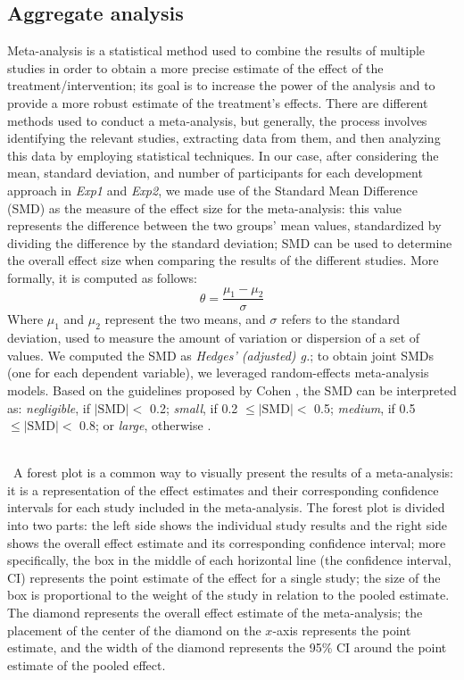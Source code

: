 \subsection{Aggregate analysis}
Meta-analysis is a statistical method used to combine the results of multiple studies in order to obtain a more precise estimate of the effect of the treatment/intervention; its goal is to increase the power of the analysis and to provide a more robust estimate of the treatment's effects.
There are different methods used to conduct a meta-analysis, but generally, the process involves identifying the relevant studies, extracting data from them, and then analyzing this data by employing statistical techniques. 
In our case, after considering the mean, standard deviation, and number of participants for each development approach in \textit{Exp1} and \textit{Exp2}, we made use of the Standard Mean Difference (SMD) as the measure of the effect size for the meta-analysis: this value represents the difference between the two groups' mean values, standardized by dividing the difference by the standard deviation; SMD can be used to determine the overall effect size when comparing the results of the different studies. More formally, it is computed as follows:
\[
    \theta = \frac{\mu_1 - \mu_2}{\sigma}
\]
Where $\mu_1$ and $\mu_2$ represent the two means, and $\sigma$ refers to the standard deviation, used to measure the amount of variation or dispersion of a set of values.
We computed the SMD as \textit{Hedges' (adjusted) g.}; to obtain joint SMDs (one for each dependent variable), we leveraged random-effects meta-analysis models.
\noindent Based on the guidelines proposed by Cohen \cite{Cohen:1992}, the SMD can be interpreted as: \textit{negligible}, if $|\text{SMD}| <$ 0.2; \textit{small}, if 0.2 $\le |\text{SMD}| <$ 0.5; \textit{medium}, if 0.5 $\le |\text{SMD}| <$ 0.8; or \textit{large}, otherwise \cite{DBLP:conf/esem/RomanoZBPS22}.

\ \\ \
A forest plot is a common way to visually present the results of a meta-analysis: it is a representation of the effect estimates and their corresponding confidence intervals for each study included in the meta-analysis. The forest plot is divided into two parts: the left side shows the individual study results and the right side shows the overall effect estimate and its corresponding confidence interval; more specifically, the box in the middle of each horizontal line (\ie the confidence interval, CI) represents the point estimate of the effect for a single study; the size of the box is proportional to the weight of the study in relation to the pooled estimate. The diamond represents the overall effect estimate of the meta-analysis; the placement of the center of the diamond on the $x$-axis represents the point estimate, and the width of the diamond represents the 95\% CI around the point estimate of the pooled effect.



